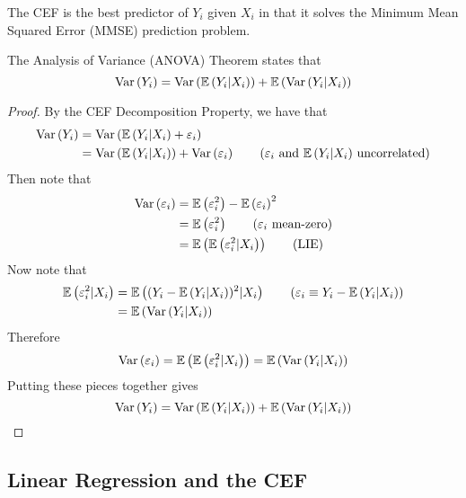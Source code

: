 \documentclass[11pt]{article}
\begin{document}
\begin{interpretation}
	The CEF is the best predictor of $Y_i$ given $X_i$ in that it solves the Minimum Mean Squared Error (MMSE) prediction problem. 
\end{interpretation}

\begin{theorem}[ANOVA]
	The Analysis of Variance (ANOVA) Theorem states that
	\begin{equation}
		\text{Var}\left( Y_i \right) = \text{Var}\left( \mathop{{}\mathbb{E}}\left( Y_i|X_i \right) \right) + \mathop{{}\mathbb{E}}\left( \text{Var}\left( Y_i|X_i \right) \right) 
	\end{equation}
\end{theorem}

\begin{proof}
	By the CEF Decomposition Property, we have that
	\begin{align*}
		\var{Y_i} &= \var{\ee{Y_i|X_i} + \e_i} \\
		&= \var{\ee{Y_i|X_i}} + \var{\e_i} \tag{$\e_i$ and $\ee{Y_i|X_i}$ uncorrelated}
	\end{align*}
	Then note that
	\begin{align*}
		\var{\e_i} &= \ee{\e_i^2} - \ee{\e_i}^2 \\
		&= \ee{\e_i^2} \tag{$\e_i$ mean-zero} \\
		&= \ee{\ee{\e_i^2|X_i}} \tag{LIE} 
	\end{align*}
	Now note that
	\begin{align*}
	   \ee{\e_i^2|X_i} 
	   &=\ee{(Y_i - \ee{Y_i|X_i})^2 | X_i} \tag{$\e_i\equiv Y_i - \ee{Y_i|X_i}$}\\
	   &=\ee{\var{Y_i|X_i}}
	\end{align*}
	Therefore 
	\begin{equation}
		\text{Var}\left( \varepsilon_i \right) = \mathop{{}\mathbb{E}}\left( \mathop{{}\mathbb{E}}\left( \varepsilon_i^2|X_i \right) \right) = \mathop{{}\mathbb{E}}\left( \text{Var}\left( Y_i|X_i \right) \right)
	\end{equation}
	Putting these pieces together gives
	\begin{equation}
		\text{Var}\left( Y_i \right) = \text{Var}\left( \mathop{{}\mathbb{E}}\left( Y_i|X_i \right) \right) + \mathop{{}\mathbb{E}}\left( \text{Var}\left( Y_i|X_i \right) \right) 
	\end{equation}	
\end{proof}

\subsection{Linear Regression and the CEF}
\end{document}
